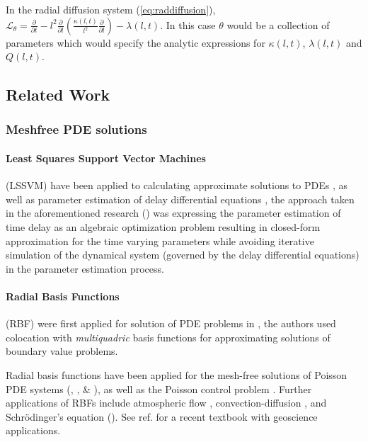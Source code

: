 \documentclass{article}
\begin{document}
In the radial diffusion system (\ref{eq:raddiffusion}), $\mathcal{L}_{\theta} =
\frac{\partial}{\partial{t}} - l^2 \frac{\partial}{\partial{l}}\left( \frac{\kappa(l,
      t)}{l^{2}} \frac{\partial}{\partial{l}} \right) - \lambda(l,
  t)$. In this case $\theta$ would be a collection of parameters which
  would specify the analytic expressions for $\kappa(l,t)$,
  $\lambda(l,t)$ and $Q(l,t)$.


\subsection{Related Work}

\subsubsection*{Meshfree PDE solutions}

\paragraph{Least Squares Support Vector Machines}

(LSSVM) have been applied to calculating approximate solutions to PDEs
\citep{MEHRKANOON2015105}, \citep{MEHRKANOON20122502} as well as
parameter estimation of delay differential equations
\citep{MEHRKANOON2014830}, the approach taken in the aforementioned
research (\citet{MEHRKANOON2014830}) was expressing the parameter
estimation of time delay as an algebraic optimization problem
resulting in closed-form approximation for the time varying parameters
while avoiding iterative simulation of the dynamical system (governed
by the delay differential equations) in the parameter estimation process.

\paragraph{Radial Basis Functions}

(RBF) were first applied for solution of PDE problems in \cite{KANSA1990147}, 
the authors used colocation with \emph{multiquadric} basis functions for approximating solutions
of boundary value problems.

Radial basis functions have been applied for the mesh-free solutions of Poisson PDE systems 
(\citep{AMINATAEI20082887}, \citep{DUAN200866}, \citep{DUAN2006394} \& \citep{CNM:CNM419}),
as well as the Poisson control problem \citet{Pearson2013}. Further applications of RBFs include 
atmospheric flow \citep{Tillenius2015406}, convection-diffusion \citep{Safdari-Vaighani2015}, and 
Schrödinger's equation (\citep{doi:10.1137/120893975, doi:10.1063/1.3637863}). See ref. \citep{fornberg2015} for a recent textbook with geoscience applications.
\end{document}
